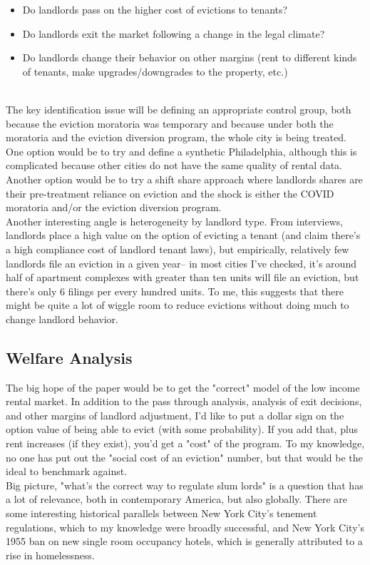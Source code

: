 \documentclass{article}
\begin{document}
\begin{itemize}
    \item Do landlords pass on the higher cost of evictions to tenants?
    \item Do landlords exit the market following a change in the legal climate?
    \item Do landlords change their behavior on other margins (rent to different kinds of tenants, make upgrades/downgrades to the property, etc.)
\end{itemize} \\

The key identification issue will be defining an appropriate control group, both because the eviction moratoria was temporary and because under both the moratoria and the eviction diversion program, the whole city is being treated. One option would be to try and define a synthetic Philadelphia, although this is complicated because other cities do not have the same quality of rental data. Another option would be to try a shift share approach where landlords shares are their pre-treatment reliance on eviction and the shock is either the COVID moratoria and/or the eviction diversion program. \\

Another interesting angle is heterogeneity by landlord type. From interviews, landlords place a high value on the option of evicting a tenant (and claim there's a high compliance cost of landlord tenant laws), but empirically, relatively few landlords file an eviction in a given year-- in most cities I've checked, it's around half of apartment complexes with greater than ten units will file an eviction, but there's only 6 filings per every hundred units. To me, this suggests that there might be quite a lot of wiggle room to reduce evictions without doing much to change landlord behavior.



\subsection{Welfare Analysis}

The big hope of the paper would be to get the "correct" model of the low income rental market. In addition to the pass through analysis, analysis of exit decisions, and other margins of landlord adjustment, I'd like to put a dollar sign on the option value of being able to evict (with some probability). If you add that, plus rent increases (if they exist), you'd get a "cost" of the program. To my knowledge, no one has put out the "social cost of an eviction" number, but that would be the ideal to benchmark against. \\

Big picture, "what's the correct way to regulate slum lords" is a question that has a lot of relevance, both in contemporary America, but also globally. There are some interesting historical parallels between New York City's tenement regulations, which to my knowledge were broadly successful, and New York City's 1955 ban on new single room occupancy hotels, which is generally attributed to a rise in homelessness.
\end{document}
